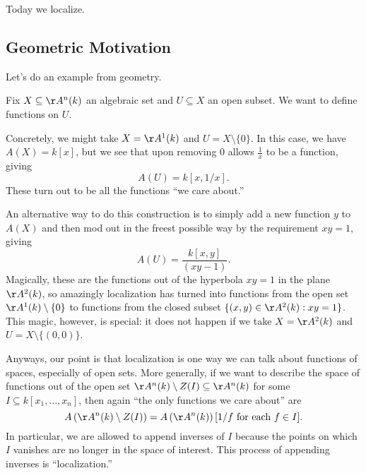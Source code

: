 \documentclass[../notes.tex]{subfiles}
\begin{document}

Today we localize.

\subsection{Geometric Motivation}
Let's do an example from geometry.

Fix $X\subseteq\AA^n(k)$ an algebraic set and $U\subseteq X$ an open subset. We want to define functions on $U$.
\begin{example}
	Concretely, we might take $X=\AA^1(k)$ and $U=X\setminus\{0\}$. In this case, we have $A(X)=k[x]$, but we see that upon removing $0$ allows $\frac1x$ to be a function, giving
	\[A(U)=k[x,1/x].\]
	These turn out to be all the functions ``we care about.''
\end{example}
An alternative way to do this construction is to simply add a new function $y$ to $A(X)$ and then mod out in the freest possible way by the requirement $xy=1$, giving
\[A(U)=\frac{k[x,y]}{(xy-1)}.\]
Magically, these are the functions out of the hyperbola $xy=1$ in the plane $\AA^2(k)$, so amazingly localization has turned into functions from the open set $\AA^1(k)\setminus\{0\}$ to functions from the closed subset $\{(x,y)\in\AA^2(k):xy=1\}$. This magic, however, is special: it does not happen if we take $X=\AA^2(k)$ and $U=X\setminus\{(0,0)\}$.

Anyways, our point is that localization is one way we can talk about functions of spaces, especially of open sets. More generally, if we want to describe the space of functions out of the open set $\AA^n(k)\setminus Z(I)\subseteq\AA^n(k)$ for some $I\subseteq k[x_1,\ldots,x_n]$, then again ``the only functions we care about'' are
\[A\left(\AA^n(k)\setminus Z(I)\right)=A\left(\AA^n(k)\right)[1/f\text{ for each }f\in I].\]
In particular, we are allowed to append inverses of $I$ because the points on which $I$ vanishes are no longer in the space of interest. This process of appending inverses is ``localization.''
\end{document}
